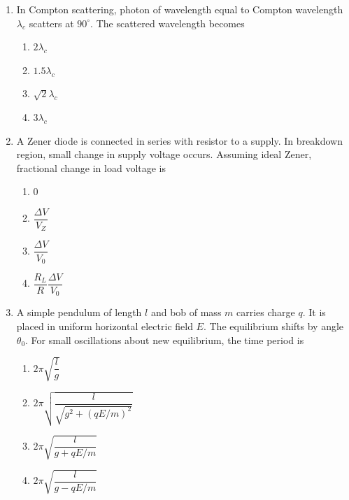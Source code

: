 \documentclass[12pt]{article}
\begin{document}
\begin{enumerate}
\item In Compton scattering, photon of wavelength equal to Compton wavelength $\lambda_c$ scatters at $90^\circ$. The scattered wavelength becomes

\begin{enumerate}
\item $2\lambda_c$
\item $1.5\lambda_c$
\item $\sqrt{2}\lambda_c$
\item $3\lambda_c$
\end{enumerate}

\item A Zener diode is connected in series with resistor to a supply. In breakdown region, small change in supply voltage occurs. Assuming ideal Zener, fractional change in load voltage is

\begin{enumerate}
\item $0$
\item $\dfrac{\Delta V}{V_Z}$
\item $\dfrac{\Delta V}{V_0}$
\item $\dfrac{R_L}{R}\dfrac{\Delta V}{V_0}$
\end{enumerate}

\item A simple pendulum of length $l$ and bob of mass $m$ carries charge $q$. It is placed in uniform horizontal electric field $E$. The equilibrium shifts by angle $\theta_0$. For small oscillations about new equilibrium, the time period is

\begin{center}
\end{center}

\begin{enumerate}
\item $2\pi\sqrt{\dfrac{l}{g}}$
\item $2\pi\sqrt{\dfrac{l}{\sqrt{g^2+(qE/m)^2}}}$
\item $2\pi\sqrt{\dfrac{l}{g+qE/m}}$
\item $2\pi\sqrt{\dfrac{l}{g-qE/m}}$
\end{enumerate}

\end{enumerate}
\end{document}
